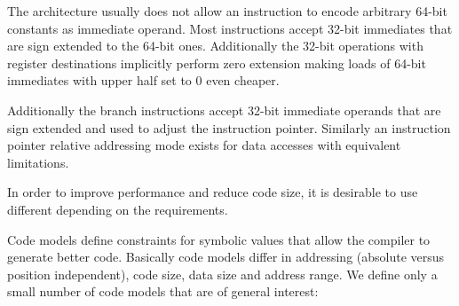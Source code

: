 The \xARCH architecture usually does not allow an instruction to encode
arbitrary
64-bit constants as immediate operand.  Most
instructions accept 32-bit immediates that are sign extended to the
64-bit ones.  Additionally the 32-bit operations with register
destinations implicitly perform zero extension making loads of 64-bit
immediates with upper half set to 0 even cheaper.

Additionally the branch instructions accept 32-bit immediate operands
that are sign extended and used to adjust the instruction pointer.
Similarly an instruction pointer relative addressing mode exists for
data accesses with equivalent limitations.

In order to improve performance and reduce code size, it is desirable
to use different  depending on the
requirements.

Code models define constraints for symbolic values that allow the
compiler to generate better code.  Basically code models differ in
addressing (absolute versus position independent), code size, data
size and address range.  We define only a small number of code models
that are of general interest:

